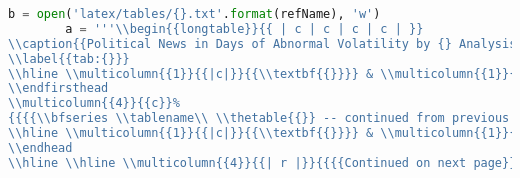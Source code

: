 \begin{lstlisting}[language=Python]
        b = open('latex/tables/{}.txt'.format(refName), 'w')
        a = '''\\begin{{longtable}}{{ | c | c | c | c | }}
\\caption{{Political News in Days of Abnormal Volatility by {} Analysis}}
\\label{{tab:{}}}
\\hline \\multicolumn{{1}}{{|c|}}{{\\textbf{{}}}} & \\multicolumn{{1}}{{c|}}{{\\textbf{{Ab. Vol.}}}} & \\multicolumn{{1}}{{c|}}{{\\textbf{{News Time}}}} & \\multicolumn{{1}}{{c|}}{{\\textbf{{Headline}}}} \\\\ \\hline \\hline
\\endfirsthead
\\multicolumn{{4}}{{c}}%
{{{{\\bfseries \\tablename\\ \\thetable{{}} -- continued from previous page}}}} \\\\
\\hline \\multicolumn{{1}}{{|c|}}{{\\textbf{{}}}} & \\multicolumn{{1}}{{c|}}{{\\textbf{{Ab. Vol.}}}} & \\multicolumn{{1}}{{c|}}{{\\textbf{{News Time}}}} & \\multicolumn{{1}}{{c|}}{{\\textbf{{Headline}}}} \\\\ \\hline \\hline
\\endhead
\\hline \\hline \\multicolumn{{4}}{{| r |}}{{{{Continued on next page}}}} \\\\ \\hline

\end{lstlisting}
